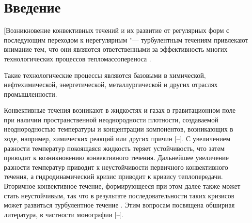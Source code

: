 







\date{}








\renewcommand{\JournalDataOnline}{\displaydate{lukashe}}



\makerutitle



\smallskip







\section*{\large Введение}



\indent



[Возникновение конвективных течений и их развитие от регулярных форм с последующим переходом к нерегулярным "--- турбулентным течениям привлекают внимание тем, что они являются ответственными за эффективность многих технологических процессов тепломассопереноса \cite{lukashev:bib1,lukashev:bib2}. 

Такие технологические процессы являются базовыми в химической, нефтехимической, энергетической, металлургической и других отраслях промышленности.

Конвективные течения возникают в жидкостях и газах в гравитационном поле при наличии пространственной неоднородности плотности, создаваемой неоднородностью температуры и концентрации компонентов, возникающих в ходе, например, химических реакций или других причин [--]. С увеличением разности температур покоящаяся жидкость теряет устойчивость, что затем приводит к возникновению конвективного течения. Дальнейшее увеличение разности температур приводит к неустойчивости первичного конвективного течения, а гидродинамический кризис приводит к кризису теплопередачи. Вторичное конвективное течение, формирующееся при этом далее также может стать неустойчивым, так что в результате последовательности таких кризисов может развиться турбулентное течение \cite{lukashev:bib1,lukashev:bib2}. Этим вопросам посвящена обширная литература, в частности монографии [--].




